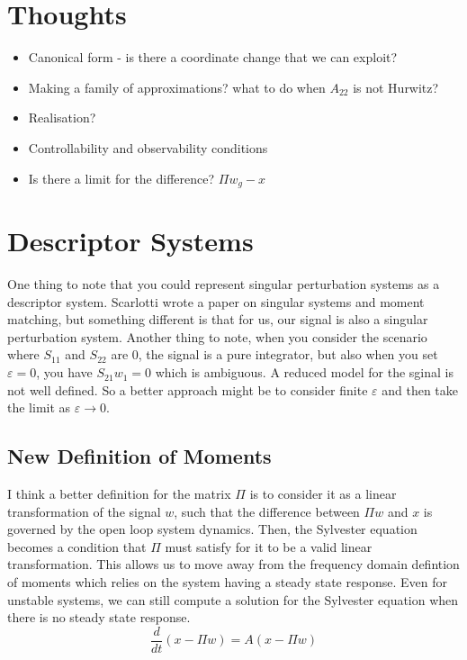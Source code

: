 \documentclass{article}
\begin{document}
\section{Thoughts}
\begin{itemize}
\item Canonical form - is there a coordinate change that we can exploit? 
\item Making a family of approximations? what to do when $A_{22}$ is not Hurwitz? 
\item Realisation?
\item Controllability and observability conditions
\item Is there a limit for the difference? $ \Pi w_g - x$
\end{itemize}

\section{Descriptor Systems}
One thing to note that you could represent singular perturbation systems as a descriptor system. 
Scarlotti wrote a paper on singular systems and moment matching, but something different is that for us, 
our signal is also a singular perturbation system. 
Another thing to note, when you consider the scenario where $S_{11}$ and $S_{22}$ are 0, the signal is a pure integrator,
but also when you set $\varepsilon =0$, you have $S_21 w_1 = 0$ which is ambiguous. 
A reduced model for the sginal is not well defined. 
So a better approach might be to consider finite $\varepsilon$ and then take the limit as $\varepsilon \to 0$.
\subsection{New Definition of Moments}
I think a better definition for the matrix $\Pi$ is to consider it as a linear transformation 
of the signal $w$, such that the difference between $\Pi w$ and $x$ is governed by the open loop system dynamics. 
Then, the Sylvester equation becomes a condition that $\Pi$ must satisfy for it to be a valid linear transformation. 
This allows us to move away from the frequency domain defintion of moments which relies on the system having a steady state response. 
Even for unstable systems, we can still compute a solution for the Sylvester equation when there is no steady state response. 
\begin{equation}
\frac{d}{dt} (x - \Pi w) = A (x - \Pi w)
\end{equation}
\end{document}
